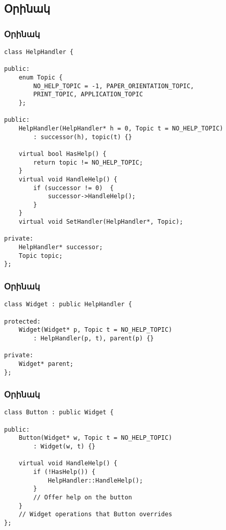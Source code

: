 \documentclass{beamer}
\begin{document}
\subsection{Օրինակ}
\begin{frame}[fragile]\frametitle{Օրինակ}
\begin{english}
\begin{verbatim}
class HelpHandler {

public:
    enum Topic {
        NO_HELP_TOPIC = -1, PAPER_ORIENTATION_TOPIC,
        PRINT_TOPIC, APPLICATION_TOPIC
    };

public:
    HelpHandler(HelpHandler* h = 0, Topic t = NO_HELP_TOPIC)
        : successor(h), topic(t) {}

    virtual bool HasHelp() {
        return topic != NO_HELP_TOPIC;
    }
    virtual void HandleHelp() {
        if (successor != 0)  {
            successor->HandleHelp();
        }
    }
    virtual void SetHandler(HelpHandler*, Topic);

private:
    HelpHandler* successor;
    Topic topic;
};
\end{verbatim}
\end{english}
\end{frame}

\begin{frame}[fragile]\frametitle{Օրինակ}
\begin{english}
\begin{verbatim}
class Widget : public HelpHandler {

protected:
    Widget(Widget* p, Topic t = NO_HELP_TOPIC)
        : HelpHandler(p, t), parent(p) {}

private:
    Widget* parent;
};
\end{verbatim}
\end{english}
\end{frame}

\begin{frame}[fragile]\frametitle{Օրինակ}
\begin{english}
\begin{verbatim}
class Button : public Widget {

public:
    Button(Widget* w, Topic t = NO_HELP_TOPIC)
        : Widget(w, t) {}

    virtual void HandleHelp() {
        if (!HasHelp()) {
            HelpHandler::HandleHelp();
        }
        // Offer help on the button
    }
    // Widget operations that Button overrides
};
\end{verbatim}
\end{english}
\end{frame}
\end{document}
